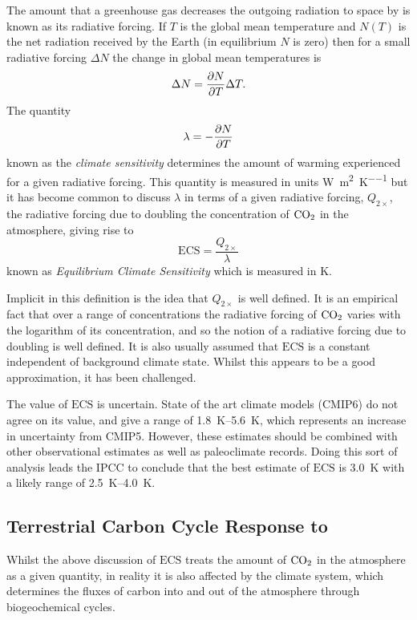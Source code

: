 The amount that a greenhouse gas decreases the outgoing radiation to space by is known as its radiative forcing. If $T$ is
the global mean temperature and $N(T)$ is the net radiation received by the Earth (in equilibrium $N$ is zero) then for a small
radiative forcing $\Delta N$ the change in global mean temperatures is
\begin{equation}
  \label{eq:response_to_radiative_forcing}
  \Delta N = \pdv{N}{T} \Delta T.
\end{equation}
The quantity
\begin{equation}
  \label{eq:climate_sensitivity}
  \lambda = -\pdv{N}{T}
\end{equation}
known as the \emph{climate sensitivity} determines the amount of warming experienced for a given radiative forcing. This quantity is measured
in units \si{\watt\per\square\meter\per\kelvin} but it has become common to discuss $\lambda$ in terms of a given radiative forcing, $Q_{2\times}$,
the radiative forcing due to doubling the concentration of $\ce{CO2}$ in the atmosphere, giving rise to
\begin{equation}
  \label{eq:definition_of_ECS}
  \mathrm{ECS} = \frac{Q_{2\times}}{\lambda}
\end{equation}
known as \emph{Equilibrium Climate Sensitivity} which is measured in \si{\kelvin}.

Implicit in this definition is the idea that $Q_{2\times}$ is well defined. It is an empirical fact that over a range of concentrations the radiative forcing
of $\ce{CO2}$ varies with the logarithm of its concentration, and so the notion of a radiative forcing due to doubling is well defined. It is also usually assumed that
$\mathrm{ECS}$ is a constant independent of background climate state. Whilst this appears to be a good approximation, it has been challenged.

The value of $\mathrm{ECS}$ is uncertain. State of the art climate models (CMIP6) do not agree on its value, and give a range of \SIrange{1.8}{5.6}{\kelvin}, which represents an
increase in uncertainty from CMIP5. However, these estimates should be combined with other observational estimates as well as paleoclimate records. Doing this sort of
analysis leads the IPCC to conclude that the best estimate of $\mathrm{ECS}$ is \SI{3.0}{\kelvin} with a likely range of \SIrange{2.5}{4.0}{\kelvin}.

\subsection{Terrestrial Carbon Cycle Response to }
Whilst the above discussion of $\mathrm{ECS}$ treats the amount of $\ce{CO2}$ in the atmosphere as a given quantity, in reality it is also affected by the climate
system, which determines the fluxes of carbon into and out of the atmosphere through biogeochemical cycles.

